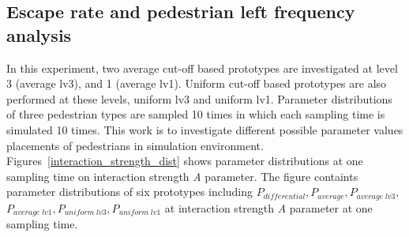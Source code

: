 \documentclass[a4paper,11pt,phdthesis,singlespace,twoside]{cssethesis}
\begin{document}
\begin{itemize}
\section{Escape rate and pedestrian left frequency analysis}
In this experiment, two average cut-off based prototypes are investigated at level 3 (average lv3), and 1 (average lv1). Uniform cut-off based prototypes are also performed at these levels, uniform lv3 and uniform lv1. Parameter distributions of three pedestrian types are sampled 10 times in which each sampling time is simulated 10 times. This work is to investigate different possible parameter values placements of pedestrians in simulation environment. Figures~\ref{interaction_strength_dist} shows parameter distributions at one sampling time on interaction strength \textit{A} parameter. The figure containts parameter distributions of six prototypes including \begin{math} P_{differential}, P_{average}, P_{average\;lv3},\end{math} \begin{math} P_{average\;lv1}, P_{uniform\;lv3}, P_{uniform\;lv1}\end{math} at interaction strength \textit{A} parameter at one sampling time.
\newpage
\begin{figure}[H]
\hspace*{-4cm}   

\end{figure}
\end{itemize}
\end{document}
